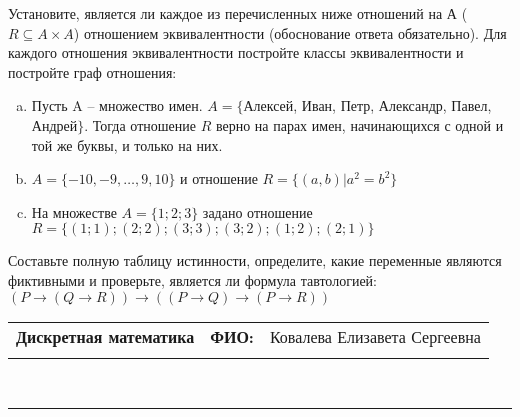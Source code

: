 \documentclass[10pt]{exam}
\newcommand{\class}{Дискретная математика}
\newcommand{\examdate}{}
\begin{document}
\begin{questions}
\question
Установите, является ли каждое из перечисленных ниже отношений на А ($R \subseteq A \times A$) отношением эквивалентности (обоснование ответа обязательно). Для каждого отношения эквивалентности постройте классы 
эквивалентности и постройте граф отношения:
\begin{enumerate} [a)]\setcounter{enumi}{0}
\item Пусть A – множество имен. $A = \{ $Алексей, Иван, Петр, Александр, Павел, Андрей$ \}$. Тогда отношение $R$ верно на парах имен, начинающихся с одной и той же буквы, и только на них.
\item $A = \{-10, -9, … , 9, 10\}$ и отношение $ R = \{(a,b)|a^{2} = b^{2}\}$
\item На множестве $A = \{1; 2; 3\}$ задано отношение $R = \{(1; 1); (2; 2); (3; 3); (3; 2); (1; 2); (2; 1)\}$
\end{enumerate}\question Составьте полную таблицу истинности, определите, какие переменные являются фиктивными и проверьте, является ли формула тавтологией:
$(P \rightarrow (Q \rightarrow R)) \rightarrow ((P \rightarrow Q) \rightarrow (P \rightarrow R))$

\end{questions}
\newpage
\begin{flushright}
\begin{tabular}{p{2.8in} r l}
\textbf{\class} & \textbf{ФИО:} &Ковалева Елизавета Сергеевна
\\

\textbf{\examdate} &&\\
\end{tabular}\\
\end{flushright}
\rule[1ex]{\textwidth}{.1pt}
\end{document}
